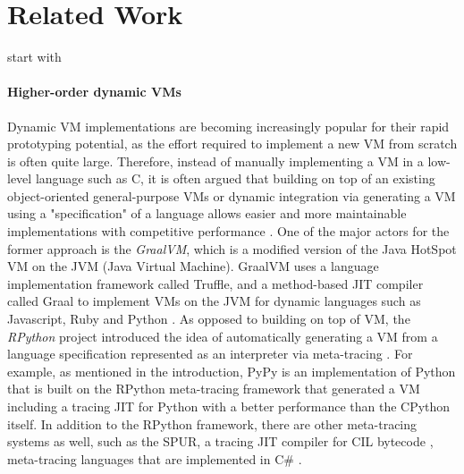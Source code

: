     \section{Related Work}
        \label{section:related-work}

        \begin{paragraph-here}%
            start with \paragraph{Higher-order dynamic VMs}%

             Dynamic VM implementations are becoming increasingly popular for their
                rapid prototyping potential, as the effort required to implement a new
                VM from scratch is often quite large. Therefore, instead of manually
                implementing a VM in a low-level language such as C, it is often
                argued that building on top of an existing object-oriented
                general-purpose VMs or dynamic integration via generating a VM using a
                "specification" of a language allows easier and more maintainable
                implementations with competitive performance
                \cite{bolzHowNotWrite}. One of the major actors for the former approach
                is the \emph{GraalVM}, which is a modified version of the Java HotSpot
                VM on the JVM (Java Virtual Machine). GraalVM uses a language
                implementation framework called Truffle, and a method-based JIT
                compiler called Graal to implement VMs on the JVM for dynamic
                languages such as Javascript, Ruby and Python \cite{truffle-graal}. As
                opposed to building on top of VM, the \emph{RPython} project
                introduced the idea of automatically generating a VM from a language
                specification represented as an interpreter via meta-tracing
                \cite{rpython07}. For example, as mentioned in the introduction, PyPy
                is an implementation of Python that is built on the RPython
                meta-tracing framework that generated a VM including a tracing JIT for
                Python with a better performance than the CPython itself. In addition
                to the RPython framework, there are other meta-tracing systems as
                well, such as the SPUR, a tracing JIT compiler for CIL bytecode
                \cite{millerCommonLanguageInfrastructure2003}, meta-tracing languages that are implemented
                in C\# \cite{spurJIT}.
        \end{paragraph-here}

